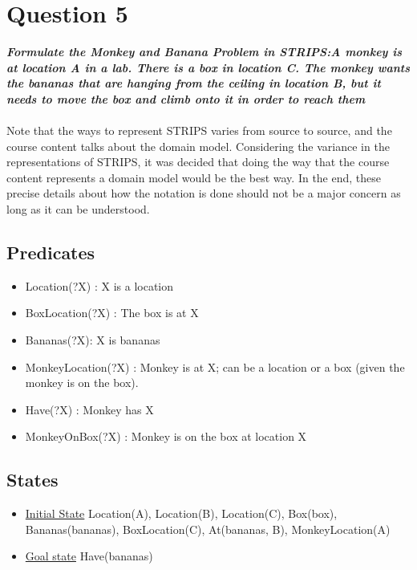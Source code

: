 \documentclass{article}
\newcommand\tab[1][1cm]{\hspace*{#1}}
\begin{document}
\section*{Question 5}
\textbf{\textit{
    \tab Formulate the Monkey and Banana Problem in STRIPS:A monkey is at
    location A in a lab. There is a box in location C. The monkey wants the
    bananas that are hanging from the ceiling in location B, but it needs to
    move the box and climb onto it in order to reach them 
}} \\ \\
Note that the ways to represent STRIPS varies from source to source, and the
course content talks about the domain model. Considering the variance in the
representations of STRIPS, it was decided that doing the way that the course
content represents a domain model would be the best way. In the end, these
precise details about how the notation is done should not be a major concern as
long as it can be understood.
\subsection*{Predicates}
\begin{itemize}
    \item Location(?X) : X is a location
    \item BoxLocation(?X) : The box is at X
    \item Bananas(?X): X is bananas
    \item MonkeyLocation(?X) : Monkey is at X; can be a location or a box (given
    the monkey is on the box).
    \item Have(?X) : Monkey has X
    \item MonkeyOnBox(?X) : Monkey is on the box at location X
\end{itemize}
\subsection*{States}
\begin{itemize}
    \item \underline{Initial State} Location(A), Location(B), Location(C),
        Box(box), Bananas(bananas), BoxLocation(C), At(bananas, B),  
        MonkeyLocation(A) 
    \item \underline{Goal state} Have(bananas)
\end{itemize}
\end{document}
